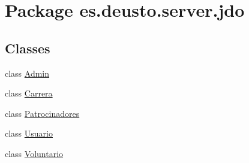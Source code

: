 \hypertarget{namespacees_1_1deusto_1_1server_1_1jdo}{}\section{Package es.\+deusto.\+server.\+jdo}
\label{namespacees_1_1deusto_1_1server_1_1jdo}
\subsection*{Classes}
\begin{DoxyCompactItemize}
\item 
class \mbox{\hyperlink{classes_1_1deusto_1_1server_1_1jdo_1_1_admin}{Admin}}
\item 
class \mbox{\hyperlink{classes_1_1deusto_1_1server_1_1jdo_1_1_carrera}{Carrera}}
\item 
class \mbox{\hyperlink{classes_1_1deusto_1_1server_1_1jdo_1_1_patrocinadores}{Patrocinadores}}
\item 
class \mbox{\hyperlink{classes_1_1deusto_1_1server_1_1jdo_1_1_usuario}{Usuario}}
\item 
class \mbox{\hyperlink{classes_1_1deusto_1_1server_1_1jdo_1_1_voluntario}{Voluntario}}
\end{DoxyCompactItemize}
